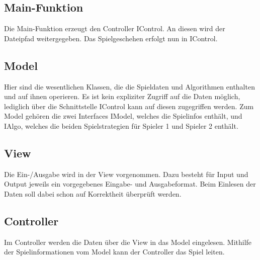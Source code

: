 \subsection{Main-Funktion}
Die Main-Funktion erzeugt den Controller IControl. An diesen wird der Dateipfad weitergegeben. Das Spielgeschehen erfolgt nun in IControl.

\subsection{Model}
Hier sind die wesentlichen Klassen, die die Spieldaten und Algorithmen enthalten und auf ihnen operieren. Es ist kein expliziter Zugriff auf die Daten möglich, lediglich über die Schnittstelle IControl kann auf diesen zugegriffen werden. Zum Model gehören die zwei Interfaces IModel, welches die Spielinfos enthält, und IAlgo, welches die beiden Spielstrategien für Spieler 1 und Spieler 2 enthält.


\subsection{View}
Die Ein-/Ausgabe wird in der View vorgenommen. Dazu besteht für Input und Output jeweils ein vorgegebenes Eingabe- und Ausgabeformat. Beim Einlesen der Daten soll dabei schon auf Korrektheit überprüft werden.

\subsection{Controller}
Im Controller werden die Daten über die View in das Model eingelesen. Mithilfe der Spielinformationen vom Model kann der Controller das Spiel leiten.

\newpage

